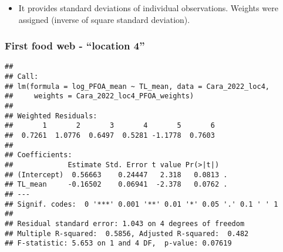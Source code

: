 \documentclass[
]{article}
\newenvironment{Shaded}{\begin{snugshade}}{\end{snugshade}}
\newcommand{\AttributeTok}[1]{\textcolor[rgb]{0.13,0.29,0.53}{#1}}
\newcommand{\CommentTok}[1]{\textcolor[rgb]{0.56,0.35,0.01}{\textit{#1}}}
\newcommand{\DecValTok}[1]{\textcolor[rgb]{0.00,0.00,0.81}{#1}}
\newcommand{\FunctionTok}[1]{\textcolor[rgb]{0.13,0.29,0.53}{\textbf{#1}}}
\newcommand{\NormalTok}[1]{#1}
\newcommand{\OtherTok}[1]{\textcolor[rgb]{0.56,0.35,0.01}{#1}}
\newcommand{\SpecialCharTok}[1]{\textcolor[rgb]{0.81,0.36,0.00}{\textbf{#1}}}
\newcommand{\StringTok}[1]{\textcolor[rgb]{0.31,0.60,0.02}{#1}}
\providecommand{\tightlist}{%
  \setlength{\itemsep}{0pt}\setlength{\parskip}{0pt}}
\begin{document}
\begin{itemize}
\tightlist
\item
  It provides standard deviations of individual observations. Weights
  were assigned (inverse of square standard deviation).
\end{itemize}

\subsubsection{First food web - ``location
4''}\label{first-food-web---location-4}

\begin{Shaded}
\end{Shaded}

\begin{verbatim}
## 
## Call:
## lm(formula = log_PFOA_mean ~ TL_mean, data = Cara_2022_loc4, 
##     weights = Cara_2022_loc4_PFOA_weights)
## 
## Weighted Residuals:
##       1       2       3       4       5       6 
##  0.7261  1.0776  0.6497  0.5281 -1.1778  0.7603 
## 
## Coefficients:
##             Estimate Std. Error t value Pr(>|t|)  
## (Intercept)  0.56663    0.24447   2.318   0.0813 .
## TL_mean     -0.16502    0.06941  -2.378   0.0762 .
## ---
## Signif. codes:  0 '***' 0.001 '**' 0.01 '*' 0.05 '.' 0.1 ' ' 1
## 
## Residual standard error: 1.043 on 4 degrees of freedom
## Multiple R-squared:  0.5856, Adjusted R-squared:  0.482 
## F-statistic: 5.653 on 1 and 4 DF,  p-value: 0.07619
\end{verbatim}
\end{document}
